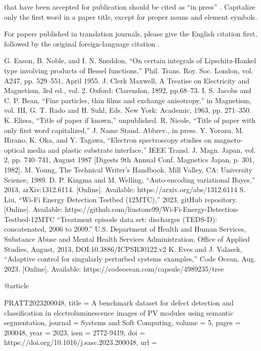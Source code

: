 \documentclass[conference]{IEEEtran}
\begin{document}
that have been accepted for publication should be cited as ``in press''
\cite{b5}.
Capitalize only the first word in a paper title, except for proper nouns and
element symbols.

For papers published in translation journals, please give the English
citation first, followed by the original foreign-language citation \cite{b6}.

\begin{thebibliography}{00}
     G. Eason, B. Noble, and I. N. Sneddon, ``On certain integrals
    of
    Lipschitz-Hankel type involving products of Bessel functions,'' Phil.
    Trans.
    Roy. Soc. London, vol. A247, pp. 529--551, April 1955.
     J. Clerk Maxwell, A Treatise on Electricity and Magnetism, 3rd
    ed., vol. 2. Oxford: Clarendon, 1892, pp.68--73.
     I. S. Jacobs and C. P. Bean, ``Fine particles, thin films and
    exchange anisotropy,'' in Magnetism, vol. III, G. T. Rado and H. Suhl, Eds.
    New
    York: Academic, 1963, pp. 271--350.
     K. Elissa, ``Title of paper if known,'' unpublished.
     R. Nicole, ``Title of paper with only first word
    capitalized,'' J.
    Name Stand. Abbrev., in press.
     Y. Yorozu, M. Hirano, K. Oka, and Y. Tagawa, ``Electron
    spectroscopy studies on magneto-optical media and plastic substrate
    interface,'' IEEE Transl. J. Magn. Japan, vol. 2, pp. 740--741, August 1987
        [Digests 9th Annual Conf. Magnetics Japan, p. 301, 1982].
     M. Young, The Technical Writer's Handbook. Mill Valley, CA:
    University Science, 1989.
     D. P. Kingma and M. Welling, ``Auto-encoding variational
    Bayes,''
    2013, arXiv:1312.6114. [Online]. Available: https://arxiv.org/abs/1312.6114
     S. Liu, ``Wi-Fi Energy Detection Testbed (12MTC),'' 2023,
    gitHub
    repository. [Online]. Available:
    https://github.com/liustone99/Wi-Fi-Energy-Detection-Testbed-12MTC
     ``Treatment episode data set: discharges (TEDS-D):
    concatenated,
    2006 to 2009.'' U.S. Department of Health and Human Services, Substance
    Abuse
    and Mental Health Services Administration, Office of Applied Studies,
    August,
    2013, DOI:10.3886/ICPSR30122.v2
     K. Eves and J. Valasek, ``Adaptive control for singularly
    perturbed systems examples,'' Code Ocean, Aug. 2023. [Online]. Available:
    https://codeocean.com/capsule/4989235/tree

    @article{PRATT2023200048,
        title = {A benchmark dataset for defect detection and classification in
                electroluminescence images of PV modules using semantic
                segmentation},
        journal = {Systems and Soft Computing},
        volume = {5},
        pages = {200048},
        year = {2023},
        issn = {2772-9419},
        doi = {https://doi.org/10.1016/j.sasc.2023.200048},
        url =

}
\end{thebibliography}
\end{document}
